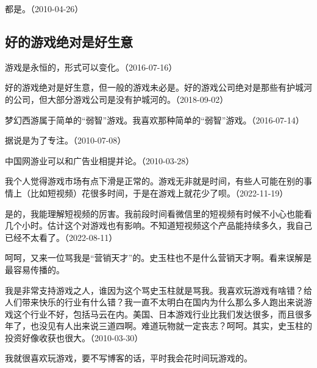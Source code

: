 都是。（2010-04-26）

\subsection{好的游戏绝对是好生意}


游戏是永恒的，形式可以变化。（2016-07-16）


好的游戏绝对是好生意，但一般的游戏未必是。好的游戏公司绝对是那些有护城河的公司，但大部分游戏公司是没有护城河的。（2018-09-02）


梦幻西游属于简单的“弱智”游戏。我喜欢那种简单的“弱智”游戏。（2016-07-14）



据说是为了专注。（2010-07-08）


中国网游业可以和广告业相提并论。（2010-03-28）

我个人觉得游戏市场有点下滑是正常的。游戏无非就是时间，有些人可能在别的事情上（比如短视频）花很多时间，于是在游戏上就花少了呗。（2022-11-19）


是的，我能理解短视频的厉害。我前段时间看微信里的短视频有时候不小心也能看几个小时。估计这个对游戏也有影响。不知道短视频这个产品能持续多久，我自己已经不太看了。（2022-08-11）

呵呵，又来一位骂我是“营销天才”的。史玉柱也不是什么营销天才啊。看来误解是最容易传播的。

我是非常支持游戏之人，谁因为这个骂史玉柱就是骂我。我喜欢玩游戏有啥错？给人们带来快乐的行业有什么错？我一直不太明白在国内为什么那么多人跑出来说游戏这个行业不好，包括马云在内。美国、日本游戏行业比我们发达很多，而且很多年了，也没见有人出来说三道四啊。难道玩物就一定丧志？呵呵。其实，史玉柱的投资好像收获也很大。（2010-03-30）


我就很喜欢玩游戏，要不写博客的话，平时我会花时间玩游戏的。

